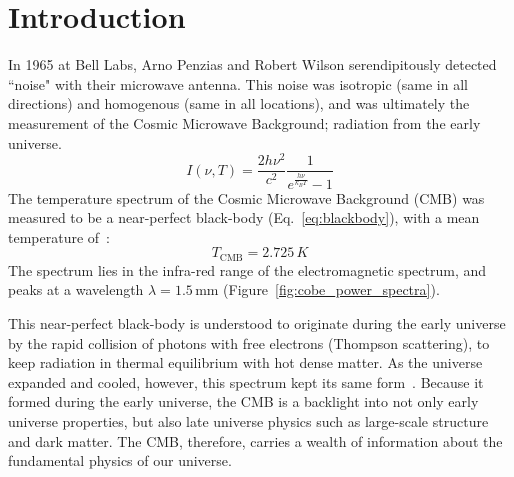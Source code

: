 
\chapter{Introduction} %

\label{ch:intro} %


\newcommand{\keyword}[1]{\textbf{#1}}
\newcommand{\tabhead}[1]{\textbf{#1}}
\newcommand{\code}[1]{\texttt{#1}}
\newcommand{\file}[1]{\texttt{\bfseries#1}}
\newcommand{\option}[1]{\texttt{\itshape#1}}

In 1965 at Bell Labs, Arno Penzias and Robert Wilson serendipitously detected ``noise" with their microwave antenna.  This noise was isotropic (same in all directions) and homogenous (same in all locations), and was ultimately the measurement of the Cosmic Microwave Background; radiation from the early universe.
\begin{equation}
    I(\nu,T) = \frac{2h\nu^2}{c^2}\frac{1}{e^{\frac{h\nu}{k_B T}} -1}
    \label{eq:blackbody}
\end{equation}
The temperature spectrum of the Cosmic Microwave Background (CMB) was measured to be a near-perfect black-body (Eq.~\ref{eq:blackbody}), with a mean temperature of~\cite{burke_graham-smith_wilkinson_2019}:
\begin{equation}
    T_{\text{CMB}} = 2.725\,K
\end{equation}
The spectrum lies in the infra-red range of the electromagnetic spectrum, and peaks at a wavelength $\lambda = 1.5\,\text{mm}$ (Figure~\ref{fig:cobe_power_spectra}). 

This near-perfect black-body is understood to originate during the early universe by the rapid collision of photons with free electrons (Thompson scattering), to keep radiation in thermal equilibrium with hot dense matter.  As the universe expanded and cooled, however, this spectrum kept its same form~\cite{weinberg_cosmo}.  Because it formed during the early universe, the CMB is a backlight into not only early universe properties, but also late universe physics such as large-scale structure and dark matter.  The CMB, therefore, carries a wealth of information about the fundamental physics of our universe.

